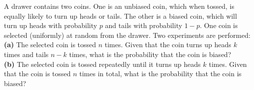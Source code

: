 \begin{exercise}
    A drawer contains two coins. One is an unbiased coin, which when tossed, is equally likely to turn up heads or tails. The other is a biased coin, which will turn up heads with probability \( p \) and tails with probability \( 1 - p \). One coin is selected (uniformly) at random from the drawer. Two experiments are performed:\\

\textbf{(a)} The selected coin is tossed \( n \) times. Given that the coin turns up heads \( k \) times and tails \( n - k \) times, what is the probability that the coin is biased?\\

\textbf{(b)} The selected coin is tossed repeatedly until it turns up heads \( k \) times. Given that the coin is tossed \( n \) times in total, what is the probability that the coin is biased?\\
\end{exercise}

